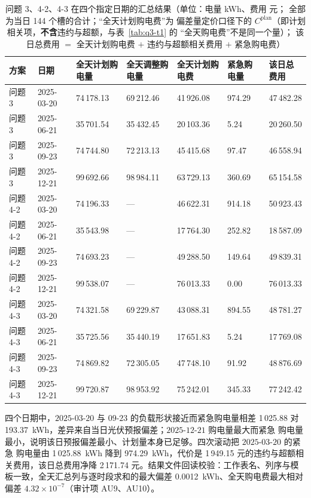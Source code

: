 \begin{table}[htbp]
  \centering
  \caption{问题 3、4-2、4-3 在四个指定日期的汇总结果（单位：电量 kWh、费用 元；
           全部为当日 144 个槽的合计；“全天计划购电费”为  偏差量定价口径下的
           \(C^{\text{plan}}\)（即计划相关项，\textbf{不含}违约与超额，与表~\ref{tab:q3-t1} 的
           “全天购电费”不是同一个量）；
           该日总费用 \(=\) 全天计划购电费 \(+\) 违约与超额相关费用 \(+\) 紧急购电费）}
  \label{tab:key4}
  \footnotesize
  \setlength{\tabcolsep}{3.5pt}
  \begin{tabular}{C{1.35cm} C{1.75cm} C{2.10cm} C{2.10cm} C{1.85cm} C{1.75cm} C{1.75cm}}
    \toprule
    方案 & 日期 & 全天计划购电量 & 全天调整购电量 & 全天计划购电费 & 紧急购电量 & 该日总费用 \\
    \midrule
    问题 3 & 2025-03-20 & 74\,178.13 & 69\,212.46 & 41\,926.08 & 974.29 & 47\,482.28 \\
    问题 3 & 2025-06-21 & 35\,701.54 & 35\,432.45 & 20\,103.36 & 5.24 & 20\,260.50 \\
    问题 3 & 2025-09-23 & 74\,744.80 & 72\,213.13 & 45\,415.68 & 97.47 & 46\,558.94 \\
    问题 3 & 2025-12-21 & 99\,692.66 & 98\,984.11 & 63\,729.13 & 360.69 & 65\,154.58 \\
    \midrule
    问题 4-2 & 2025-03-20 & 74\,196.33 & --- & 46\,622.31 & 914.18 & 50\,923.43 \\
    问题 4-2 & 2025-06-21 & 35\,543.98 & --- & 17\,764.30 & 252.82 & 18\,587.09 \\
    问题 4-2 & 2025-09-23 & 74\,693.23 & --- & 49\,288.50 & 149.64 & 49\,839.31 \\
    问题 4-2 & 2025-12-21 & 99\,538.07 & --- & 76\,013.33 & 0.00 & 76\,013.33 \\
    \midrule
    问题 4-3 & 2025-03-20 & 74\,321.58 & 69\,229.87 & 43\,088.31 & 894.55 & 48\,781.27 \\
    问题 4-3 & 2025-06-21 & 35\,725.56 & 35\,440.19 & 17\,651.83 & 5.24 & 17\,769.08 \\
    问题 4-3 & 2025-09-23 & 74\,869.82 & 72\,305.05 & 47\,748.10 & 91.92 & 48\,876.69 \\
    问题 4-3 & 2025-12-21 & 99\,720.87 & 98\,953.92 & 75\,242.01 & 345.33 & 77\,242.42 \\
    \bottomrule
  \end{tabular}
\end{table}

四个日期中，\(2025\text{-}03\text{-}20\) 与 \(09\text{-}23\) 的负载形状接近而紧急购电量相差
1\,025.88 对 193.37~kWh，差异来自当日光伏预报偏差；\(2025\text{-}12\text{-}21\) 购电量最大而紧急
购电量最小，说明该日预报偏差最小、计划量本身已足够。四次滚动把 \(2025\text{-}03\text{-}20\) 的紧急
购电量由 1\,025.88~kWh 降到 974.29~kWh，代价是 1\,949.15 元的违约与超额相关费用，该日总费用净降
2\,171.74 元。结果文件回读校验：工作表名、列序与模板一致，全天汇总列与逐时段求和的最大偏差
0.0012~kWh、全天购电费最大相对偏差 \(4.32\times10^{-7}\)（审计项 AU9、AU10）。
